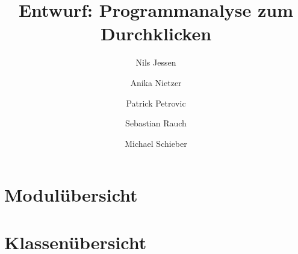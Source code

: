 \documentclass[parskip=full,11pt]{scrartcl}
\begin{document}
	\title{Entwurf: Programmanalyse zum Durchklicken}
	\author{Nils Jessen \and Anika Nietzer \and Patrick Petrovic \and Sebastian Rauch \and Michael Schieber}
	
	\maketitle
	
	\section{Modulübersicht}
	
	
	
	
	
	
	
	\section{Klassenübersicht}
	
	
	
	
	
	
	
	
\end{document}
